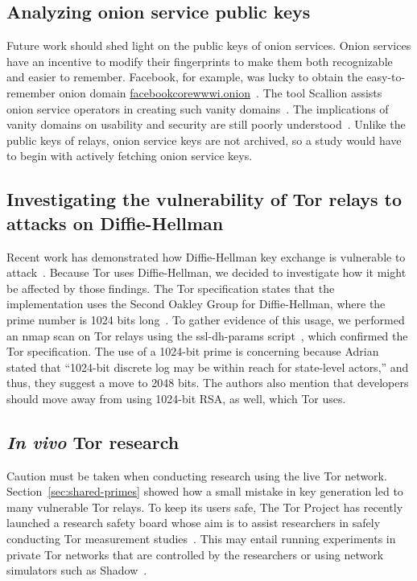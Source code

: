 \subsection{Analyzing onion service public keys}
Future work should shed light on the public keys of onion services.  Onion
services have an incentive to modify their fingerprints to make them both
recognizable and easier to remember.  Facebook, for example, was lucky to
obtain the easy-to-remember onion domain
\url{facebookcorewwwi.onion}~\cite{facebook}.  The tool Scallion assists onion
service operators in creating such vanity domains~\cite{scallion}.  The
implications of vanity domains on usability and security are still poorly
understood~\cite{vanity-domains}.  Unlike the public keys of relays, onion
service keys are not archived, so a study would have to begin with actively
fetching onion service keys.

\subsection{Investigating the vulnerability of Tor relays to attacks on Diffie-Hellman}
Recent work has demonstrated how Diffie-Hellman key exchange is vulnerable to
attack~\cite{Adrian2015a,Valenta2017a,Dorey2017a}.  Because Tor uses
Diffie-Hellman, we decided to investigate how it might be affected by those
findings.  The Tor specification states that the implementation uses the Second
Oakley Group for Diffie-Hellman, where the prime number is 1024 bits
long~\cite[\S~0.3]{torspec}. To gather evidence of this usage, we performed an
nmap scan on Tor relays using the ssl-dh-params script~\cite{nmapdhscript},
which confirmed the Tor specification. The use of a 1024-bit prime is
concerning because Adrian \ea~\cite{Adrian2015a} stated that ``1024-bit discrete
log may be within reach for state-level actors,'' and thus, they suggest a move
to 2048 bits. The authors also mention that developers should move away from
using 1024-bit RSA, as well, which Tor uses.

\subsection{\textit{In vivo} Tor research}
Caution must be taken when conducting research using the live Tor network.
Section~\ref{sec:shared-primes} showed how a small mistake in key generation led
to many vulnerable Tor relays.  To keep its users safe, The Tor Project has
recently launched a research safety board whose aim is to assist researchers in
safely conducting Tor measurement studies~\cite{safety-board}.  This may entail
running experiments in private Tor networks that are controlled by the
researchers or using network simulators such as Shadow~\cite{Jansen2012a}.

